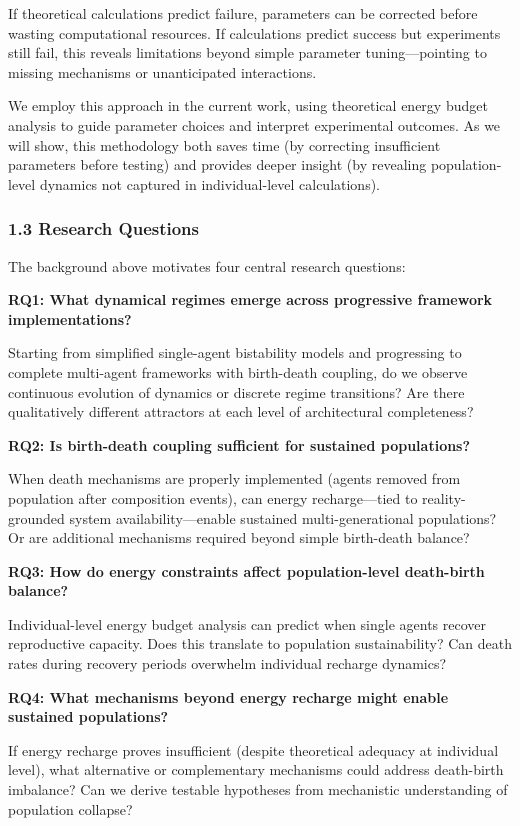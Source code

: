 \documentclass[
]{article}
\begin{document}
If theoretical calculations predict failure, parameters can be corrected
before wasting computational resources. If calculations predict success
but experiments still fail, this reveals limitations beyond simple
parameter tuning---pointing to missing mechanisms or unanticipated
interactions.

We employ this approach in the current work, using theoretical energy
budget analysis to guide parameter choices and interpret experimental
outcomes. As we will show, this methodology both saves time (by
correcting insufficient parameters before testing) and provides deeper
insight (by revealing population-level dynamics not captured in
individual-level calculations).

\subsubsection{1.3 Research Questions}\label{research-questions}

The background above motivates four central research questions:

\textbf{RQ1: What dynamical regimes emerge across progressive framework
implementations?}

Starting from simplified single-agent bistability models and progressing
to complete multi-agent frameworks with birth-death coupling, do we
observe continuous evolution of dynamics or discrete regime transitions?
Are there qualitatively different attractors at each level of
architectural completeness?

\textbf{RQ2: Is birth-death coupling sufficient for sustained
populations?}

When death mechanisms are properly implemented (agents removed from
population after composition events), can energy recharge---tied to
reality-grounded system availability---enable sustained
multi-generational populations? Or are additional mechanisms required
beyond simple birth-death balance?

\textbf{RQ3: How do energy constraints affect population-level
death-birth balance?}

Individual-level energy budget analysis can predict when single agents
recover reproductive capacity. Does this translate to population
sustainability? Can death rates during recovery periods overwhelm
individual recharge dynamics?

\textbf{RQ4: What mechanisms beyond energy recharge might enable
sustained populations?}

If energy recharge proves insufficient (despite theoretical adequacy at
individual level), what alternative or complementary mechanisms could
address death-birth imbalance? Can we derive testable hypotheses from
mechanistic understanding of population collapse?
\end{document}
